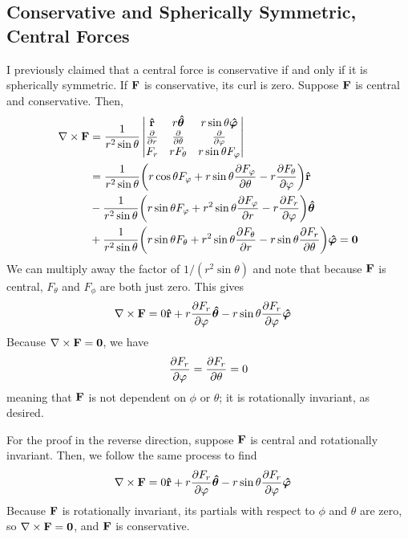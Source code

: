 \subsection*{Conservative and Spherically Symmetric, Central Forces}
I previously claimed that a central force is conservative if and only if it is spherically symmetric. If $\mathbf{F}$ is conservative, its curl is zero. Suppose $\mathbf{F}$ is central and conservative. Then,
\begin{align*}
    \nabla \times\mbf{F} &= \frac{1}{r^2\sin\theta}\begin{vmatrix}
    \rhat & r\bm{\hat\theta} & r\sin\theta \bm{\hat\phi} \\
    \pdv{r} & \pdv{\theta} & \pdv{\phi} \\
    F_r & rF_\theta & r\sin\theta F_\phi
\end{vmatrix} \\
&= \frac{1}{r^2\sin\theta}\pqty{r\cos\theta F_\phi + r\sin\theta \pdv{F_\phi}{\theta} - r\pdv{F_\theta}{\phi}}\rhat \\
&- \frac{1}{r^2\sin\theta}\pqty{r\sin\theta F_\phi + r^2 \sin\theta \pdv{F_\phi}{r} - r\pdv{F_r}{\phi}}\bm{\hat\theta} \\
&+ \frac{1}{r^2\sin\theta}\pqty{r\sin\theta F_\theta + r^2\sin\theta \pdv{F_\theta}{r} - r\sin\theta \pdv{F_r}{\theta}}\bm{\hat\phi} = \mbf{0}
\end{align*}
We can multiply away the factor of $1/(r^2\sin\theta)$ and note that because $\mathbf{F}$ is central, $F_\theta$ and $F_\phi$ are both just zero. This gives
\begin{align*}
    \nabla \times \mathbf{F} &= 0\mathbf{\hat{r}} + r\pdv{F_r}{\varphi}\bm{\hat\theta} - r\sin\theta \pdv{F_r}{\varphi}\bm{\hat{\varphi}}
\end{align*}
Because $\nabla\times\mathbf{F} = \mathbf{0}$, we have
\[ \pdv{F_r}{\varphi} = \pdv{F_r}{\theta} = 0\]
meaning that $\mathbf{F}$ is not dependent on $\phi$ or $\theta$; it is rotationally invariant, as desired.

For the proof in the reverse direction, suppose $\mathbf{F}$ is central and rotationally invariant. Then, we follow the same process to find
\begin{align*}
    \nabla \times \mathbf{F} &= 0\mathbf{\hat{r}} + r\pdv{F_r}{\varphi}\bm{\hat\theta} - r\sin\theta \pdv{F_r}{\varphi}\bm{\hat{\varphi}}
\end{align*}
Because $\mathbf{F}$ is rotationally invariant, its partials with respect to $\phi$ and $\theta$ are zero, so $\nabla\times\mathbf{F} = \mathbf{0}$, and $\mathbf{F}$ is conservative.

